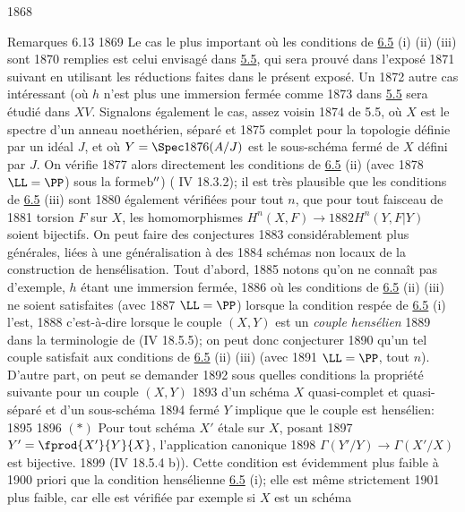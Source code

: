   1868	\begin{enonce*}[remark]{Remarques 6.13}
  1869	Le cas le plus important où les conditions de \hyperref[XII.prop6.5]{6.5} (i) (ii) (iii) sont
  1870	remplies est celui envisagé dans \hyperref[XII.cor5.5]{5.5}, qui sera prouvé dans l'exposé
  1871	suivant en utilisant les réductions faites dans le présent exposé. Un
  1872	autre cas intéressant (où $h$ n'est plus une immersion fermée comme
  1873	dans \hyperref[XII.cor5.5]{5.5} sera étudié dans $XV$. Signalons également le cas, assez voisin
  1874	de 5.5, où $X$ est le spectre d'un anneau noethérien, séparé et
  1875	complet pour la topologie définie par un idéal $J$, et où $Y=\Spec
  1876	(A/J)$ est le sous-schéma fermé de $X$ défini par $J$. On vérifie
  1877	alors directement les conditions de \hyperref[XII.prop6.5]{6.5} (ii) (avec
  1878	$\LL=\PP$) sous la forme\pageoriginale ${\rm b''}$) (	IV 18.3.2); il est très plausible que les conditions de \hyperref[XII.prop6.5]{6.5} (iii) sont
  1880	également vérifiées pour tout $n$, \ie que pour tout faisceau de
  1881	torsion $F$ sur $X$, les homomorphismes $H^n(X,F)\rightarrow
  1882	H^n(Y,F|Y)$ soient bijectifs. On peut faire des conjectures
  1883	considérablement plus générales, liées à une généralisation à des
  1884	schémas non locaux de la construction de hensélisation. Tout d'abord,
  1885	notons qu'on ne connaît pas d'exemple, $h$ étant une immersion fermée,
  1886	où les conditions de \hyperref[XII.prop6.5]{6.5} (ii) (iii) ne soient satisfaites (avec
  1887	$\LL=\PP$) lorsque la condition respée de \hyperref[XII.prop6.5]{6.5} (i) l'est,
  1888	c'est-à-dire lorsque le couple $(X,Y)$ est un \emph{couple hensélien}
  1889	dans la terminologie de (\EGA IV 18.5.5); on peut donc conjecturer
  1890	qu'un tel couple satisfait aux conditions de \hyperref[XII.prop6.5]{6.5} (ii) (iii) (avec
  1891	$\LL=\PP$, tout $n$). D'autre part, on peut se demander
  1892	sous quelles conditions la propriété suivante pour un couple $(X,Y)$
  1893	d'un schéma $X$ quasi-complet et quasi-séparé et d'un sous-schéma
  1894	fermé $Y$ implique que le couple est hensélien:
  1895	
  1896	$(\ast)$ Pour tout schéma $X'$ étale sur $X$, posant
  1897	$Y'=\fprod{X'}{Y}{X}$, l'application canonique
  1898	$\Gamma(Y'/Y)\rightarrow \Gamma(X'/X)$ est bijective.
  1899	(\Cf \EGA IV 18.5.4 b)). Cette condition est évidemment plus faible à
  1900	priori que la condition hensélienne \hyperref[XII.prop6.5]{6.5} (i); elle est même strictement
  1901	plus faible, car elle est vérifiée par exemple si $X$ est un schéma

\end{enonce*}

